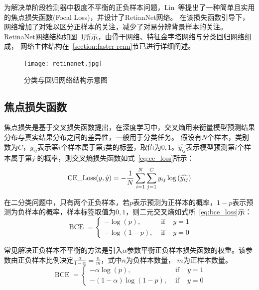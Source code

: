 为解决单阶段检测器中极度不平衡的正负样本问题，Lin~\cite{lin2017focal}等提出了一种简单且实用的焦点损失函数(Focal Loss)，并设计了RetianNet网络。
在该损失函数引导下，网络增加了对难以区分正样本的关注，减少了对易分辨背景样本的关注。RetinaNet网络结构如图~\ref{fig:retinanet}所示，由骨干网络、特征金字塔网络与分类回归网络组成，
网络主体结构在~\ref{section:faster-rcnn}节已进行详细阐述。

\begin{figure}[htbp]                     
  \centering                      
  \texttt{[image: retinanet.jpg]}                      
  \caption{分类与回归网络结构示意图}                      
  \label{fig:retinanet}       
\end{figure}   

\subsection{焦点损失函数}
焦点损失是基于交叉损失函数提出，在深度学习中，交叉熵用来衡量模型预测结果分布与真实结果分布之间的差异性，一般用于分类任务。
假设有$N$个样本，类别数为$C$，$y_{ij}$表示第$i$个样本属于第$j$类的标签，取值为$0, 1$。$\hat{y_{ij}}$表示模型预测第$i$个样本属于第$j$
的概率，则交叉熵损失函数如式~\ref{eq:ce_loss}所示：
\begin{equation}   
  {\rm{CE}}\_{\rm{Loss}}(y,\hat y) =  - \frac{1}{N}\sum\limits_{i = 1}^N {\sum\limits_{j = 1}^C {{y_{ij}}} } \log \left( {\widehat {{y_{ij}}}} \right)
  \label{eq:ce_loss} 
\end{equation}

在二分类问题中，只有两个正负样本，若$p$表示预测为正样本的概率，$1-p$表示预测为负样本的概率，样本标签取值为$0,1$，则二元交叉熵如式所~\ref{eq:bce_loss}示：
\begin{equation}         
  \operatorname{BCE}=\left\{\begin{array}{ccc} -\log (p), & \text { if } & y=1 \\ -\log (1-p), & \text { if } & y=0 \end{array}\right.  
  \label{eq:bce_loss}   
\end{equation} 

常见解决正负样本不平衡的方法是引入$\alpha$参数平衡正负样本损失函数的权重。该参数由正负样本比例决定$\frac{\alpha}{1-\alpha} = \frac{n}{m}$，式中$n$为负样本数量，
$m$为正样本数量。
\begin{equation}            
  \operatorname{BCE}=\left\{\begin{array}{ccc} -\alpha \log (p), & \text { if } & y=1 \\ -(1-\alpha) \log (1-p), & \text { if } & y=0 \end{array}\right.    
  \label{eq:bce_loss_alpha}    
\end{equation} 

